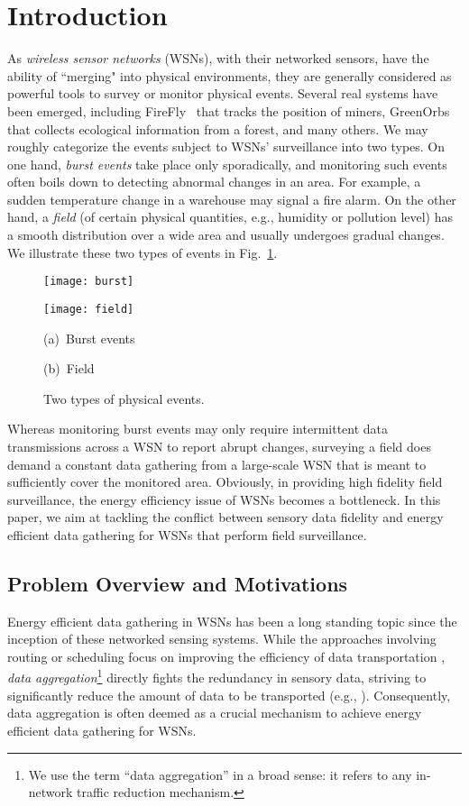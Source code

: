 \documentclass[conference]{IEEEtran}
\begin{document}
\section{Introduction} \label{sec:intro}
As \textit{wireless sensor networks} (WSNs), with their networked sensors, have the ability of ``merging"  into physical environments, they are generally considered as powerful tools to survey or monitor physical events. Several real systems have been emerged, including FireFly~\cite{Firefly} that tracks the position of miners, GreenOrbs~\cite{greenorbs} that collects ecological information from a forest, and many others. We may roughly categorize the events subject to WSNs' surveillance into two types. On one hand, \textit{burst events} take place only sporadically, and monitoring such events often boils down to detecting abnormal changes in an area. For example, a sudden temperature change in a warehouse may signal a fire alarm. On the other hand, a \textit{field} (of certain physical quantities, e.g., humidity or pollution level) has a smooth distribution over a wide area and usually undergoes gradual changes. We illustrate these two types of events in Fig.~\ref{fig:phyevents}.
  \begin{figure}[ht]
    \parbox{\columnwidth}{\parbox{.49\columnwidth}{\center\texttt{[image: burst]}}
                              \parbox{.49\columnwidth}{\center\texttt{[image: field]}}}
    \parbox{\columnwidth}{\parbox{.49\columnwidth}{\center\scriptsize(a)~Burst events}
                              \parbox{.49\columnwidth}{\center\scriptsize(b)~Field}}
    \caption{Two types of physical events.} \label{fig:phyevents}
\end{figure}

  Whereas monitoring burst events may only require intermittent data transmissions across a WSN to report abrupt changes, surveying a field does demand a constant data gathering from a large-scale WSN that is meant to sufficiently cover the monitored area. Obviously, in providing high fidelity field surveillance, the energy efficiency issue of WSNs becomes a bottleneck. In this paper, we aim at tackling the conflict between sensory data fidelity and energy efficient data gathering for WSNs that perform field surveillance.

  \subsection{Problem Overview and Motivations} \label{sec:overmotiv}
Energy efficient data gathering in WSNs has been a long standing topic since the inception of these networked sensing systems. While the approaches involving routing or scheduling focus on improving the efficiency of data transportation \cite{GanesanCBL-ToSN06,FanLS-TMC07,WuLLL-TPDS10}, \textit{data aggregation}\footnote{We use the term ``data aggregation'' in a broad sense: it refers to any in-network traffic reduction mechanism.} directly fights the redundancy in sensory data, striving to significantly reduce the amount of data to be transported (e.g., \cite{Madden-OSR02,Cristescu-ToN06,Gupta-ToSN08}). Consequently, data aggregation is often deemed as a crucial mechanism to achieve energy efficient data gathering for WSNs.
\end{document}
